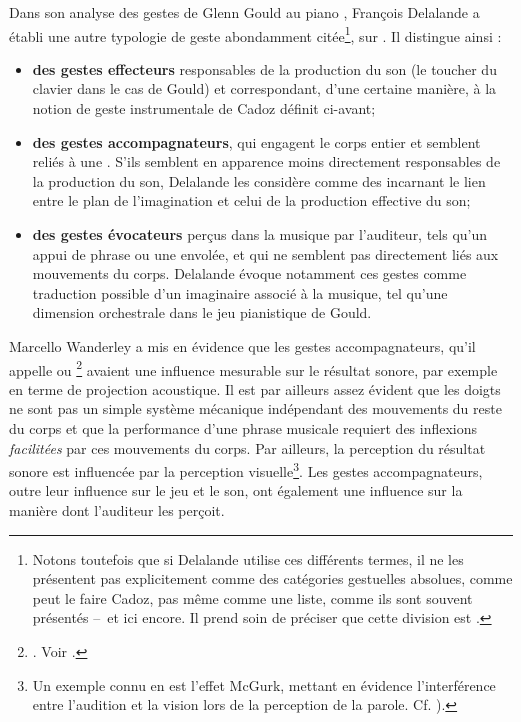 \noindent Dans son analyse des gestes de Glenn Gould au piano \cite{delalande_geste_1988}, François Delalande a établi une autre typologie de geste abondamment citée\footnote{Notons toutefois que si Delalande utilise ces différents termes, il ne les présentent pas explicitement comme des catégories gestuelles absolues, comme peut le faire Cadoz, pas même comme une liste, comme ils sont souvent présentés --~et ici encore. Il prend soin de préciser que cette division est  \cite{delalande_geste_1988}.}, sur . Il distingue ainsi :
\vspace{-1em}
\begin{itemize}[noitemsep]
	\item \textbf{des gestes effecteurs} responsables de la production du son (le toucher du clavier dans le cas de Gould) et correspondant, d'une certaine manière, à la notion de geste instrumentale de Cadoz définit ci-avant;
	\item \textbf{des gestes accompagnateurs}, qui engagent le corps entier et semblent reliés à une . S'ils semblent en apparence moins directement responsables de la production du son, Delalande les considère comme des  incarnant le lien entre le plan de l'imagination et celui de la production effective du son;
	\item \textbf{des gestes évocateurs} perçus dans la musique par l'auditeur, tels qu'un appui de phrase ou une envolée, et qui ne semblent pas directement liés aux mouvements du corps. Delalande évoque notamment ces gestes comme traduction possible d'un imaginaire associé à la musique, tel qu'une dimension orchestrale dans le jeu pianistique de Gould.
\end{itemize}
\noindent Marcello Wanderley a mis en évidence que les gestes accompagnateurs, qu'il appelle  ou \footnote{. Voir \cite{wanderley_non-obvious_1999}.} avaient une influence mesurable sur le résultat sonore, par exemple en terme de projection acoustique. Il est par ailleurs assez évident que les doigts ne sont pas un simple système mécanique indépendant des mouvements du reste du corps et que la performance d'une phrase musicale requiert des inflexions \textit{facilitées} par ces mouvements du corps. Par ailleurs, la perception du résultat sonore est influencée par la perception visuelle\footnote{Un exemple connu en est l'effet McGurk, mettant en évidence l'interférence entre l'audition et la vision lors de la perception de la parole. Cf. \cite{macdonald_visual_1978}).}. Les gestes accompagnateurs, outre leur influence sur le jeu et le son, ont également une influence sur la manière dont l'auditeur les perçoit. 

